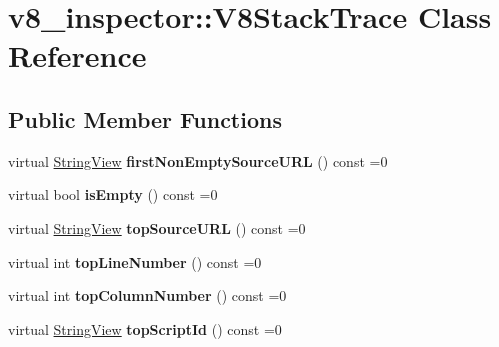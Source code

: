\hypertarget{classv8__inspector_1_1V8StackTrace}{}\section{v8\+\_\+inspector\+:\+:V8\+Stack\+Trace Class Reference}
\label{classv8__inspector_1_1V8StackTrace}
\subsection*{Public Member Functions}
\begin{DoxyCompactItemize}
\item 
\mbox{\label{classv8__inspector_1_1V8StackTrace_a32e15ef6ab406cce52702b8b7351d9d5}} 
virtual \mbox{\hyperlink{classv8__inspector_1_1StringView}{String\+View}} {\bfseries first\+Non\+Empty\+Source\+U\+RL} () const =0
\item 
\mbox{\label{classv8__inspector_1_1V8StackTrace_a969853e542a4df1eafd84da4cdd53728}} 
virtual bool {\bfseries is\+Empty} () const =0
\item 
\mbox{\label{classv8__inspector_1_1V8StackTrace_a66a69050f9e87393455fbbf989f1d01d}} 
virtual \mbox{\hyperlink{classv8__inspector_1_1StringView}{String\+View}} {\bfseries top\+Source\+U\+RL} () const =0
\item 
\mbox{\label{classv8__inspector_1_1V8StackTrace_a12a71905644e1faf9c820abafa9d94f9}} 
virtual int {\bfseries top\+Line\+Number} () const =0
\item 
\mbox{\label{classv8__inspector_1_1V8StackTrace_a7c6a4edfd7769e73e2f0562659a57a53}} 
virtual int {\bfseries top\+Column\+Number} () const =0
\item 
\mbox{\label{classv8__inspector_1_1V8StackTrace_a82e378f1190c0215d21656980c427b13}} 
virtual \mbox{\hyperlink{classv8__inspector_1_1StringView}{String\+View}} {\bfseries top\+Script\+Id} () const =0
\item 
\mbox{\label{classv8__inspector_1_1V8StackTrace_a0d7ede4b2a6ba52372a42295924fd7f1}} 

\end{DoxyCompactItemize}
